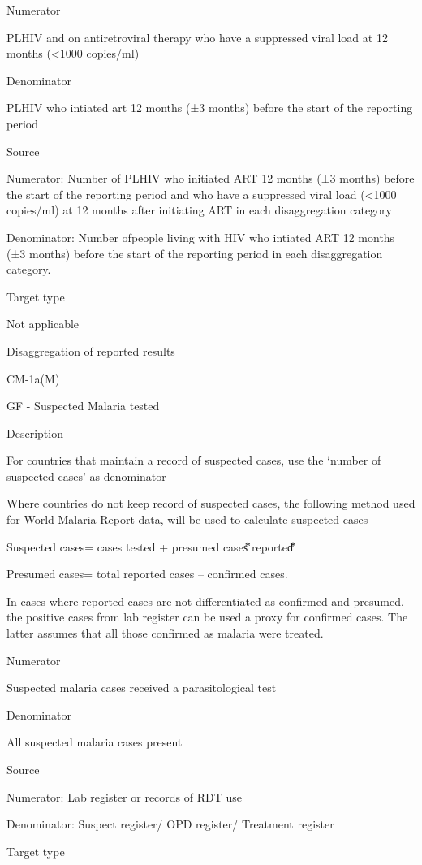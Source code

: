 \documentclass[]{book}
\begin{document}
Numerator

PLHIV and on antiretroviral therapy who have a suppressed viral load at 12 months (\textless{}1000 copies/ml)

Denominator

PLHIV who intiated art 12 months (±3 months) before the start of the reporting period

Source

Numerator: Number of PLHIV who initiated ART 12 months (±3 months) before the start of the reporting period and who have a suppressed viral load (\textless{}1000 copies/ml) at 12 months after initiating ART in each disaggregation category

Denominator: Number ofpeople living with HIV who intiated ART 12 months (±3 months) before the start of the reporting period in each disaggregation category.

Target type

Not applicable

Disaggregation of reported results

CM-1a(M)

GF - Suspected Malaria tested

Description

For countries that maintain a record of suspected cases, use the `number of suspected cases' as denominator

Where countries do not keep record of suspected cases, the following method used for World Malaria Report data, will be used to calculate suspected cases

Suspected cases= cases tested + presumed cases⃰ reported⃰

Presumed cases= total reported cases -- confirmed cases.

In cases where reported cases are not differentiated as confirmed and presumed, the positive cases from lab register can be used a proxy for confirmed cases.
The latter assumes that all those confirmed as malaria were treated.

Numerator

Suspected malaria cases received a parasitological test

Denominator

All suspected malaria cases present

Source

Numerator: Lab register or records of RDT use

Denominator: Suspect register/ OPD register/ Treatment register

Target type
\end{document}
